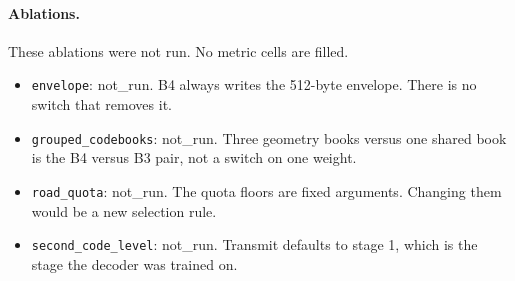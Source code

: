 \paragraph{Ablations.}
These ablations were not run. No metric cells are filled.
\begin{itemize}
\item \texttt{envelope}: not\_run. B4 always writes the 512-byte envelope. There is no switch that removes it.
\item \texttt{grouped\_codebooks}: not\_run. Three geometry books versus one shared book is the B4 versus B3 pair, not a switch on one weight.
\item \texttt{road\_quota}: not\_run. The quota floors are fixed arguments. Changing them would be a new selection rule.
\item \texttt{second\_code\_level}: not\_run. Transmit defaults to stage 1, which is the stage the decoder was trained on.
\end{itemize}
